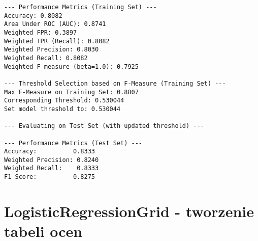 \documentclass{article}
\begin{document}
\begin{verbatim}
--- Performance Metrics (Training Set) ---
Accuracy: 0.8082
Area Under ROC (AUC): 0.8741
Weighted FPR: 0.3897
Weighted TPR (Recall): 0.8082
Weighted Precision: 0.8030
Weighted Recall: 0.8082
Weighted F-measure (beta=1.0): 0.7925

--- Threshold Selection based on F-Measure (Training Set) ---
Max F-Measure on Training Set: 0.8807
Corresponding Threshold: 0.530044
Set model threshold to: 0.530044

--- Evaluating on Test Set (with updated threshold) ---

--- Performance Metrics (Test Set) ---
Accuracy:          0.8333
Weighted Precision: 0.8240
Weighted Recall:    0.8333
F1 Score:          0.8275
\end{verbatim}


\section{LogisticRegressionGrid - tworzenie tabeli ocen}
\end{document}
